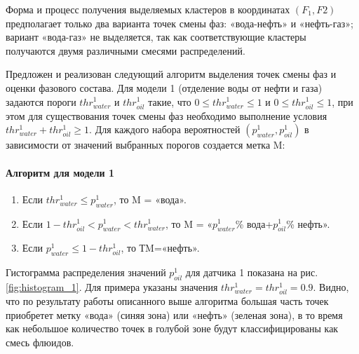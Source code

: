 \par
Форма и процесс получения выделяемых кластеров в координатах $\left(F_1, F2\right)$ предполагает только два варианта точек смены фаз: «вода-нефть» и «нефть-газ»; вариант «вода-газ» не выделяется, так как соответствующие кластеры получаются двумя различными смесями распределений.

\par
Предложен и реализован следующий алгоритм выделения точек смены фаз и оценки фазового состава. Для модели 1 (отделение воды от нефти и газа) задаются пороги $thr_{water}^1$ и $thr_{oil}^1$ такие, что $0\leq thr_{water}^1 \leq 1$ и $0\leq thr_{oil}^1 \leq 1$, при этом для существования точек смены фаз необходимо выполнение условия $thr_{water}^1+thr_{oil}^1\geq 1$. Для каждого набора вероятностей $(p_{water}^1,p_{oil}^1)$  в зависимости от значений выбранных порогов создается метка M:
\paragraph{Алгоритм для модели 1}
\begin{enumerate}[label=\arabic*.]
    \item Если $thr_{water}^1 \leq p_{water}^1$, то M = «вода».
    \item Если $1-thr_{oil}^1< p_{water}^1<thr_{water}^1$, то M = «$p_{water}^1$\% вода+$p_{oil}^1$\% нефть».
    \item Если $p_{water}^1\leq 1-thr_{oil}^1$, то ТM=«нефть».
\end{enumerate}
	
\par
Гистограмма распределения значений $p_{oil}^1$ для датчика 1 показана на рис.\ref{fig:histogram_1}. Для примера указаны значения $thr_{water}^1= thr_{oil}^1=0.9$. Видно, что по результату работы описанного выше алгоритма большая часть точек приобретет метку «вода» (синяя зона) или «нефть» (зеленая зона), в то время как небольшое количество точек в голубой зоне будут классифицированы как смесь флюидов.
 
